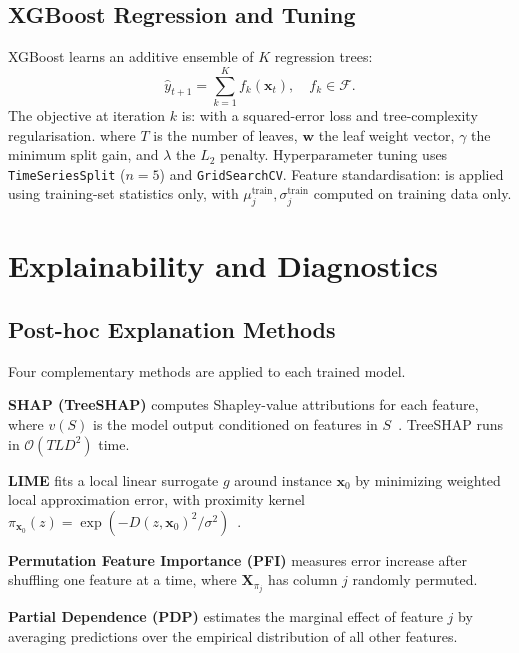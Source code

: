\documentclass[10pt,twocolumn,letterpaper]{article}
\begin{document}
\subsection{XGBoost Regression and Tuning}

XGBoost learns an additive ensemble of $K$ regression trees:
\begin{equation}
  \hat{y}_{t+1} = \sum_{k=1}^{K} f_k(\mathbf{x}_t),\quad f_k \in \mathcal{F}.
  \label{eq:xgb_ensemble}
\end{equation}
The objective at iteration $k$ is:
with a squared-error loss and tree-complexity regularisation.
where $T$ is the number of leaves, $\mathbf{w}$ the leaf weight
vector, $\gamma$ the minimum split gain, and $\lambda$ the $L_2$
penalty. Hyperparameter tuning uses \texttt{TimeSeriesSplit}
($n{=}5$) and \texttt{GridSearchCV}. Feature standardisation:
is applied using training-set statistics only,
with $\mu_j^{\text{train}}, \sigma_j^{\text{train}}$ computed on
training data only.

\section{Explainability and Diagnostics}

\subsection{Post-hoc Explanation Methods}

Four complementary methods are applied to each trained model.

\textbf{SHAP (TreeSHAP)} computes Shapley-value attributions for each
feature,
where $v(S)$ is the model output conditioned on features in
$S$~\cite{lundberg2017shap}. TreeSHAP runs in
$\mathcal{O}(TLD^2)$ time.

\textbf{LIME} fits a local linear surrogate $g$ around instance
$\mathbf{x}_0$ by minimizing weighted local approximation error,
with proximity kernel
$\pi_{\mathbf{x}_0}(z) = \exp\!\left(-D(z,\mathbf{x}_0)^2/\sigma^2\right)$~\cite{ribeiro2016lime}.

\textbf{Permutation Feature Importance (PFI)} measures error increase
after shuffling one feature at a time,
where $\mathbf{X}_{\pi_j}$ has column $j$ randomly permuted.

\textbf{Partial Dependence (PDP)} estimates the marginal effect of
feature $j$ by averaging predictions over the empirical distribution of
all other features.
\end{document}
